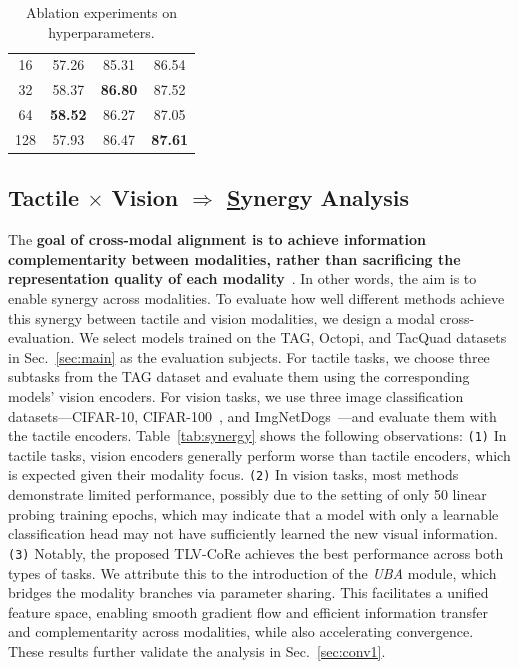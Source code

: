 \documentclass[letterpaper]{article} %
\theoremstyle{definition}                %
\theoremstyle{plain}                     %
\theoremstyle{remark}                    %
\begin{document}
\begin{table}[ht]
\begin{minipage}[t]{0.32\textwidth}
\begin{tabular}{@{}c|ccc@{}}
  16   &  57.26         &  85.31 &     86.54      \\
  32    & 58.37          & \textbf{86.80}          & 87.52 \\
  64    &  \textbf{58.52}         &  86.27         &   87.05        \\
  128     & 57.93 &     86.47      &   \textbf{87.61}        \\ \bottomrule[1.2pt]
  \end{tabular}%
\end{minipage}
\vspace{-0.2cm}
\caption{Ablation experiments on hyperparameters.}  %
\label{tab:ablation}
\vspace{-0.3cm}
\end{table}




\subsection{Tactile $\times$ Vision $\Rightarrow$ \underline{S}ynergy Analysis}
\label{sec:times}

The \textbf{goal of cross-modal alignment is to achieve information complementarity between modalities, rather than sacrificing the representation quality of each modality}~\cite{wang2022deep, dufumier2024align}. In other words, the aim is to enable synergy across modalities. To evaluate how well different methods achieve this synergy between tactile and vision modalities, we design a modal cross-evaluation. We select models trained on the TAG, Octopi, and TacQuad datasets in Sec.~\ref{sec:main} as the evaluation subjects. For tactile tasks, we choose three subtasks from the TAG dataset and evaluate them using the corresponding models’ vision encoders. For vision tasks, we use three image classification datasets—CIFAR-10, CIFAR-100~\cite{krizhevsky2009learning}, and ImgNetDogs~\cite{raduly2018dog}—and evaluate them with the tactile encoders. Table~\ref{tab:synergy} shows the following observations: \texttt{(1)} In tactile tasks, vision encoders generally perform worse than tactile encoders, which is expected given their modality focus. \texttt{(2)} In vision tasks, most methods demonstrate limited performance, possibly due to the setting of only 50 linear probing training epochs, which may indicate that a model with only a learnable classification head may not have sufficiently learned the new visual information. \texttt{(3)} Notably, the proposed TLV-CoRe achieves the best performance across both types of tasks. We attribute this to the introduction of the \textit{UBA} module, which bridges the modality branches via parameter sharing. This facilitates a unified feature space, enabling smooth gradient flow and efficient information transfer and complementarity across modalities, while also accelerating convergence. These results further validate the analysis in Sec.~\ref{sec:conv1}.
\end{document}
